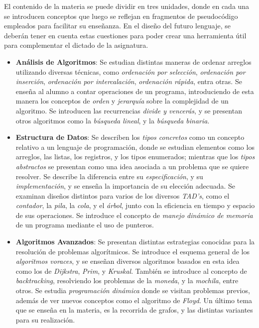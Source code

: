 El contenido de la materia se puede dividir en tres unidades, donde en cada una se introducen conceptos que luego se reflejan en fragmentos de pseudocódigo empleados para facilitar su enseñanza.
En el diseño del futuro lenguaje, se deberán tener en cuenta estas cuestiones para poder crear una herramienta útil para complementar el dictado de la asignatura.
\begin{itemize}
    \item \textbf{Análisis de Algoritmos}:
    Se estudian distintas maneras de ordenar arreglos utilizando diversas técnicas, como \textit{ordenación por selección}, \textit{ordenación por inserción}, \textit{ordenación por intercalación}, \textit{ordenación rápida}, entra otras.
    Se enseña al alumno a contar operaciones de un programa, introduciendo de esta manera los conceptos de \textit{orden} y \textit{jerarquía} sobre la complejidad de un algoritmo.
    Se introducen las recurrencias \textit{divide y vencerás}, y se presentan otros algoritmos como la \textit{búsqueda lineal}, y la \textit{búsqueda binaria}.
    \item \textbf{Estructura de Datos}:
    Se describen los \textit{tipos concretos} como un concepto relativo a un lenguaje de programación, donde se estudian elementos como los arreglos, las listas, los registros, y los tipos enumerados; mientras que los \textit{tipos abstractos} se presentan como una idea asociada a un problema que se quiere resolver.
    Se describe la diferencia entre su \textit{especificación}, y su \textit{implementación}, y se enseña la importancia de su elección adecuada.
    Se examinan diseños distintos para varios de los diversos \textit{TAD's}, como el \textit{contador}, la \textit{pila}, la \textit{cola}, y el \textit{árbol}, junto con la eficiencia en tiempo y espacio de sus operaciones.
    Se introduce el concepto de \textit{manejo dinámico de memoria} de un programa mediante el uso de punteros.
    \item \textbf{Algoritmos Avanzados}:
    Se presentan distintas estrategias conocidas para la resolución de problemas algorítmicos.
    Se introduce el esquema general de los \textit{algoritmos voraces}, y se enseñan diversos algoritmos basados en esta idea como los de \textit{Dijkstra}, \textit{Prim}, y \textit{Kruskal}.
    También se introduce al concepto de \textit{backtracking}, resolviendo los problemas de la \textit{moneda}, y la \textit{mochila}, entre otros.
    Se estudia \textit{programación dinámica} donde se visitan problemas previos, además de ver nuevos conceptos como el algoritmo de \textit{Floyd}.
    Un último tema que se enseña en la materia, es la recorrida de grafos, y las distintas variantes para su realización.
\end{itemize}
\fi


